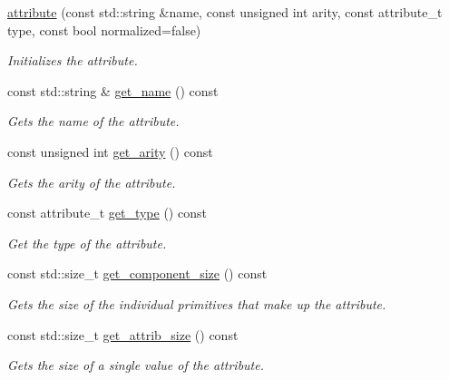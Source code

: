 \begin{DoxyCompactItemize}
\item 
\hyperlink{classoccluded_1_1buffers_1_1attributes_1_1attribute_a31868f0f2c3714b048bde8aca537755e}{attribute} (const std\+::string \&name, const unsigned int arity, const attribute\+\_\+t type, const bool normalized=false)
\begin{DoxyCompactList}\small\item\em Initializes the attribute. \end{DoxyCompactList}\item 
const std\+::string \& \hyperlink{classoccluded_1_1buffers_1_1attributes_1_1attribute_a3c7cd10a78a7539168f4d47bbfb96430}{get\+\_\+name} () const 
\begin{DoxyCompactList}\small\item\em Gets the name of the attribute. \end{DoxyCompactList}\item 
const unsigned int \hyperlink{classoccluded_1_1buffers_1_1attributes_1_1attribute_af9931141c3f65ff744ae811ceccffd55}{get\+\_\+arity} () const 
\begin{DoxyCompactList}\small\item\em Gets the arity of the attribute. \end{DoxyCompactList}\item 
const attribute\+\_\+t \hyperlink{classoccluded_1_1buffers_1_1attributes_1_1attribute_aefb7b7a891c3f31e92f9927ed1410855}{get\+\_\+type} () const 
\begin{DoxyCompactList}\small\item\em Get the type of the attribute. \end{DoxyCompactList}\item 
const std\+::size\+\_\+t \hyperlink{classoccluded_1_1buffers_1_1attributes_1_1attribute_ab0ddaf5ff9916ff4970752aa29bb83c1}{get\+\_\+component\+\_\+size} () const 
\begin{DoxyCompactList}\small\item\em Gets the size of the individual primitives that make up the attribute. \end{DoxyCompactList}\item 
const std\+::size\+\_\+t \hyperlink{classoccluded_1_1buffers_1_1attributes_1_1attribute_a5024f30a77a271262209e8e6f51932d8}{get\+\_\+attrib\+\_\+size} () const 
\begin{DoxyCompactList}\small\item\em Gets the size of a single value of the attribute. \end{DoxyCompactList}\item 

\end{DoxyCompactItemize}
